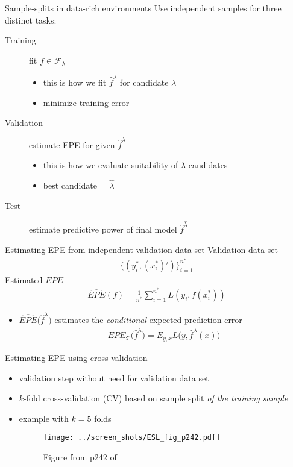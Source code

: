 \documentclass[xcolor=dvipsnames]{beamer}
\begin{document}
\begin{frame}{Sample-splits in data-rich environments}
Use independent samples for three distinct tasks: 
\begin{description}
\item[Training] fit $f \in \mathcal{F}_{\lambda}$
\begin{itemize}
  \item this is how we fit $\hat{f}^{\lambda}$ for candidate $\lambda$
  \item minimize training error
\end{itemize}
\item[Validation] estimate EPE for given $\hat{f}^{\lambda}$
\begin{itemize}
  \item this is how we evaluate suitability of $\lambda$ candidates
  \item best candidate = $\hat{\lambda}$
\end{itemize}
\item[Test] estimate predictive power of final model $\hat{f}^{\hat{\lambda}}$
\end{description}
\end{frame}

\begin{frame}{Estimating EPE from independent validation data set}
Validation data set 
\begin{align*}
  \{(y^*_i, (x_i^*)')\}_{i=1}^{n^*}
\end{align*}
\pause 
Estimated $EPE$
\begin{align*}
  \widehat{EPE}\left(f\right) = \frac{1}{n^*} \sum_{i=1}^{n^*} L\left(y_i, f(x^*_i)\right)   
\end{align*}
\pause 
\begin{itemize}
  \item $\widehat{EPE}\big(\hat{f}^{\lambda}\big)$ estimates the \emph{conditional} expected prediction error
  \begin{align*}
    EPE_{\mathcal{T}} \big(\hat{f}^{\lambda}\big) = E_{y, x} L \big(y, \hat{f}^{\lambda}(x) \big)
  \end{align*}
\end{itemize}
\end{frame}


\begin{frame}{Estimating EPE using cross-validation}
\begin{itemize}
  \item validation step without need for validation data set
  \pause
  \item $k$-fold cross-validation (CV) based on sample split \emph{of the training sample}
  \pause 
  \item example with $k=5$ folds
  \begin{figure}
  \texttt{[image: ../screen\_shots/ESL\_fig\_p242.pdf]}
   \caption{Figure from p242 of \textcite{hastie2009elements}}
\end{figure}
\end{itemize}
\end{frame}
\end{document}
